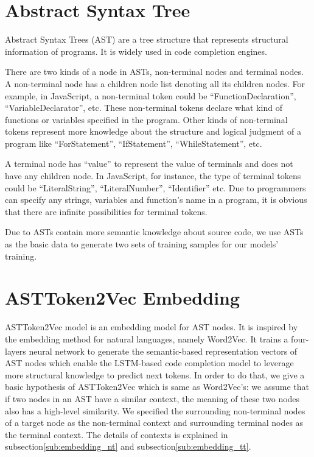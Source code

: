 \documentclass[T, E]{compsoft}
\begin{document}
\section{Abstract Syntax Tree}
Abstract Syntax Trees (AST) are a tree structure that represents structural information of programs. It is widely used in code completion engines.

There are two kinds of a node in ASTs, non-terminal nodes and terminal nodes. 
A non-terminal node has a children node list denoting all its children nodes. 
For example, in JavaScript, a non-terminal token could be ``FunctionDeclaration'', ``VariableDeclarator'', etc. 
These non-terminal tokens declare what kind of functions or variables specified in the program. 
Other kinds of non-terminal tokens represent more knowledge about the structure and logical judgment of a program like ``ForStatement'', ``IfStatement'', ``WhileStatement'', etc. 

A terminal node has ``value'' to represent the value of terminals and does not have any children node. 
In JavaScript, for instance, the type of terminal tokens could be ``LiteralString'', ``LiteralNumber'', ``Identifier'' etc. 
Due to programmers can specify any strings, variables and function's name in a program, it is obvious that there are infinite possibilities for terminal tokens.

Due to ASTs contain more semantic knowledge about source code, we use ASTs as the basic data to generate two sets of training samples for our models' training.



\section{ASTToken2Vec Embedding}
\label{section:node2vec}
ASTToken2Vec model is an embedding model for AST nodes. It is inspired by the embedding method for natural languages, namely Word2Vec\cite{word2vec}. 
It trains a four-layers neural network to generate the semantic-based representation vectors of AST nodes which enable the LSTM-based code completion model to leverage more structural knowledge to predict next tokens.
In order to do that, we give a basic hypothesis of ASTToken2Vec which is same as Word2Vec's: we assume that if two nodes in an AST have a similar context, the meaning of these two nodes also has a high-level similarity. 
We specified the surrounding non-terminal nodes of a target node as the non-terminal context and surrounding terminal nodes as the terminal context. The details of contexts is explained in subsection\ref{sub:embedding_nt} and subsection\ref{sub:embedding_tt}.
\end{document}
